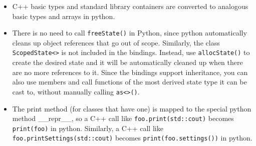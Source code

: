\begin {itemize}
\item C++ basic types and standard library containers are converted to analogous
basic types and arrays in python.
\item There is no need to call \texttt{freeState()} in Python, since python
automatically cleans up object references that go out of scope. Similarly, the
class \texttt{ScopedState<>} is not included in the bindings. Instead, use
\texttt{allocState()} to create the desired state and it will be automatically
cleaned up when there are no more references to it. Since the bindings support
inheritance, you can also use members and call functions of the most derived state
type it can be cast to, without manually calling \texttt{as<>()}.
\item The print method (for classes that have one) is mapped to the special
python method \_\_repr\_\_, so a C++ call like \texttt{foo.print(std::cout)}
becomes \texttt{print(foo)} in python. Similarly, a C++ call like
\texttt{foo.printSettings(std::cout)} becomes \linebreak
\texttt{print(foo.settings())} in python.
\end {itemize}
